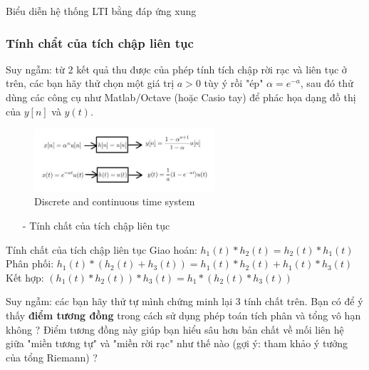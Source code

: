 \documentclass[8pt]{beamer}
\begin{document}
\begin{frame}{Biểu diễn hệ thống LTI bằng đáp ứng xung}
\subsubsection{Tính chẩt của tích chập liên tục}
Suy ngẫm: từ $2$ kết quả thu được của phép tính tích chập rời rạc và liên tục ở trên, các bạn hãy thử chọn một giá trị $a>0$ tùy ý rồi "ép" $\alpha=e^{-a}$, sau đó thử dùng các công cụ như Matlab/Octave (hoặc Casio tay) để phác họa dạng đồ thị của $y[n]$ và $y(t)$.

\begin{figure}[h]
			\includegraphics[width=0.6\textwidth]{result.jpg}
			\caption{Discrete and continuous time system}\label{fig:re9}
		\end{figure}
\begin{itemize}
	\item[-] Tính chất của tích chập liên tục
\end{itemize}
\begin{block}{Tính chất của tích chập liên tục}
	Giao hoán: $h_{1}(t)*h_{2}(t)=h_{2}(t)*h_{1}(t)$\\
	Phân phối: $h_{1}(t)*(h_{2}(t)+h_{3}(t))=h_{1}(t)*h_{2}(t)+h_{1}(t)*h_{3}(t)$\\
	Kết hợp: $(h_{1}(t)*h_{2}(t))*h_{3}(t)=h_{1}*(h_{2}(t)*h_{3}(t))$\\
\end{block}
Suy ngẫm: các bạn hãy thử tự mình chứng minh lại $3$ tính chất trên. Bạn có để ý thấy \textbf{điểm tương đồng} trong cách sử dụng phép toán tích phân và tổng vô hạn không ? Điểm tương đồng này giúp bạn hiểu sâu hơn bản chất về mối liên hệ giữa "miền tương tự" và "miền rời rạc" như thế nào (gợi ý: tham khảo ý tưởng của tổng Riemann) ?
\end{frame}
\end{document}
